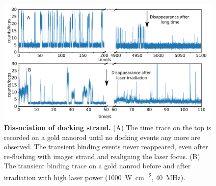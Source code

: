 \begin{figure}[ht]
  \centering
  \includegraphics[width=\textwidth]{dissociation_transbind}
  \makeatletter
  \renewcommand{\fnum@figure}{\figurename~S\thefigure}
  \makeatother
  \caption{\textbf{Dissociation of docking strand.}
  (A) The time trace on the top is recorded on a gold nanorod until no docking events any more are observed.
  The transient binding events never reappeared, even after re-flushing with imager strand and realigning the laser focus.
  (B) The transient binding trace on a gold nanrod before and after irradiation with high laser power (\SI[per-mode=repeated-symbol]{1000}{\watt\per\cm\squared}, \SI{40}{\MHz}).
  }
  \label{SIfig:dissociation_transbind}
\end{figure}